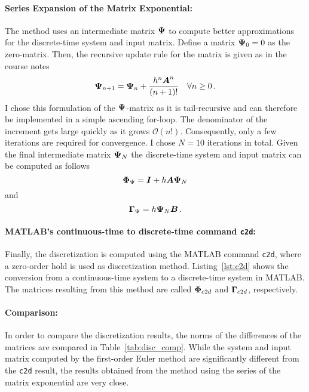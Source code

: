 \paragraph{Series Expansion of the Matrix Exponential: } The method uses an intermediate matrix $\boldsymbol{\Psi}$ to compute better approximations for the discrete-time system and input matrix.
Define a matrix $\boldsymbol{\Psi}_0 = 0$ as the zero-matrix.
Then, the recursive update rule for the matrix is given as in the course notes
\begin{equation}
	\boldsymbol{\Psi}_{n+1} = \boldsymbol{\Psi}_n + \frac{h^n \boldsymbol{A}^n}{(n+1)!} \quad \forall n\ge0\, .
\end{equation}
I chose this formulation of the $\boldsymbol{\Psi}$-matrix as it is tail-recursive and can therefore be implemented in a simple ascending for-loop.
The denominator of the increment gets large quickly as it grows $\mathcal{O}(n!)$.
Consequently, only a few iterations are required for convergence. 
I chose $N=10$ iterations in total.
Given the final intermediate matrix $\boldsymbol{\Psi}_N$ the discrete-time system and input matrix can be computed as follows
\begin{equation}
	\boldsymbol{\Phi}_{\Psi} = \boldsymbol{I} + h\boldsymbol{A}\boldsymbol{\Psi}_N	
\end{equation}
and
\begin{equation}
	\boldsymbol{\Gamma}_{\Psi} = h\boldsymbol{\Psi}_N \boldsymbol{B}\, .
\end{equation}

\paragraph{MATLAB's continuous-time to discrete-time command \texttt{c2d}: } Finally, the discretization is computed using the MATLAB command \texttt{c2d}, where a zero-order hold is used as discretization method.
Listing~\ref{lst:c2d} shows the conversion from a continuous-time system to a discrete-time system in MATLAB.
The matrices resulting from this method are called $\boldsymbol{\Phi}_{c2d}$ and $\boldsymbol{\Gamma}_{c2d}$, respectively.

\paragraph{Comparison: } In order to compare the discretization results, the norms of the differences of the matrices are compared in Table~\ref{tab:disc_comp}.
While the system and input matrix computed by the first-order Euler method are significantly different from the \texttt{c2d} result, the results obtained from the method using the series of the matrix exponential are very close.

